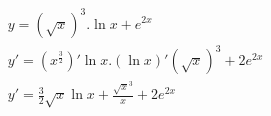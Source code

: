 \begin{ex}
\begin{align}
&y=(\sqrt{x})^3.\ln{x}+e^{2x}\nonumber\\
&y'=\left(x^\frac{3}{2}\right)'\ln{x}.(\ln{x})'(\sqrt{x})^3+2e^{2x}\nonumber\\
&y'=\frac{3}{2}\sqrt{x}\ln{x}+\frac{\sqrt{x}^3}{x}+2e^{2x}\nonumber
\end{align}
\end{ex}